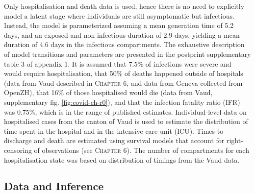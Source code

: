 Only hospitalisation and death data is used, hence there is no need to explicitly model a latent stage where individuals are still asymptomatic but infectious\cite[-8\baselineskip]{Ganyani:EstimatingGenerationInterval:2020,He:TemporalDynamicsViral:2020, Liu:ContributionPresymptomaticInfection:2020}. Instead, the model is parameterized assuming a mean generation time of 5.2 days\cite[-2\baselineskip]{Ganyani:EstimatingGenerationInterval:2020}, and an exposed and non-infectious duration of 2.9 days\cite[-1\baselineskip]{He:TemporalDynamicsViral:2020}, yielding a mean duration of 4.6 days in the infectious compartments. The exhaustive description of model transitions and parameters are presented in the postprint supplementary table 3 of appendix 1. It is assumed that 7.5\% of infections were severe and would require hospitalisation, that 50\% of deaths happened outside of hospitals (data from Vaud described in \textsc{Chapter 6}, and data from Geneva collected from OpenZH), that 16\% of those hospitalised would die (data from Vaud, supplementary fig. \ref{fig:covid-ch-r0}), and that the infection fatality ratio (IFR) was 0.75\%, which is in the range of published estimates\cite[-4\baselineskip]{Verity:EstimatesSeverityCoronavirus:2020, Russell:EstimatingInfectionCase:2020}. Individual-level data on hospitalised cases from the canton of Vaud is used to estimate the distribution of time spent in the hospital and in the intensive care unit (ICU). Times to discharge and death are estimated using survival models that account for right-censoring of observations (see \textsc{Chapter 6}). The number of compartments for each hospitalisation state was based on distribution of timings from the Vaud data. 
\subsection{Data and Inference} 
